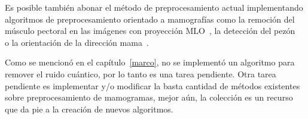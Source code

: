 Es posible también abonar el método de preprocesamiento actual implementando
algoritmos de preprocesamiento orientado a mamografías como la remoción del
músculo pectoral en las imágenes con proyección MLO~\cite{raba2005breast}, la
detección del pezón~\cite{mendez1996automatic} o la orientación de la dirección
mama~\cite{masek2003automatic}.

Como se mencionó en el capítulo~\ref{marco}, no se implementó un algoritmo para
remover el ruido cuántico, por lo tanto es una tarea pendiente. Otra tarea
pendiente es implementar y/o modificar la basta cantidad de métodos existentes
sobre preprocesamiento de mamogramas, mejor aún, la colección es un recurso que
da pie a la creación de nuevos algoritmos.


